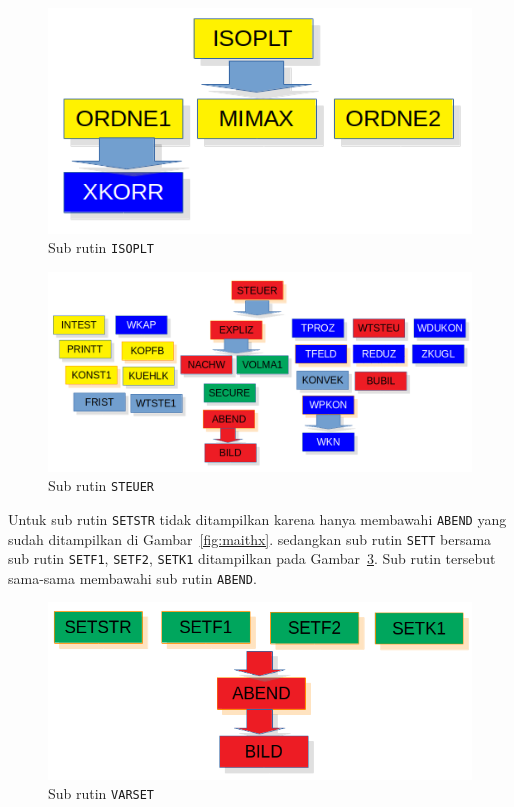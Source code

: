\documentclass[a4paper,11pt]{report}
\renewcommand{\figurename}{Gambar}
\begin{document}
\begin{figure}[h!]
  \begin{center}
    \includegraphics[scale=.5]{../isoplt.png}
    \caption{Sub rutin \texttt{ISOPLT}}
    \label{fig:isoplt}
  \end{center}
\end{figure}

\begin{figure}[h!]
  \begin{center}
    \includegraphics[scale=.5]{../steuer.png}
    \caption{Sub rutin \texttt{STEUER}}
    \label{fig:steuer}
  \end{center}
\end{figure}

Untuk sub rutin \texttt{SETSTR} tidak ditampilkan karena hanya membawahi \texttt{ABEND} yang sudah ditampilkan di \figurename~\ref{fig:maithx}. sedangkan sub rutin \texttt{SETT} bersama sub rutin \texttt{SETF1}, \texttt{SETF2}, \texttt{SETK1} ditampilkan pada \figurename~\ref{fig:varset}. Sub rutin tersebut sama-sama membawahi sub rutin \texttt{ABEND}.

\begin{figure}[h!]
  \begin{center}
    \includegraphics[scale=.5]{../varSET.png}
    \caption{Sub rutin \texttt{VARSET}}
    \label{fig:varset}
  \end{center}
\end{figure}
\end{document}
